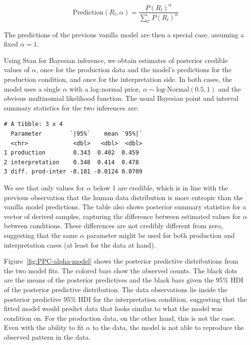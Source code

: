 \documentclass{article}
\begin{document}
\[\text{Prediction}(R_{l}, \alpha) = \frac{P(R_{l})^\alpha}{\sum_{l'} P(R_{l})^\alpha}\]

The predictions of the previous vanilla model are then a special case, assuming a fixed \(\alpha =1\).

Using Stan \citep{Team2023:The-Stan-Core-L} for Bayesian inference, we obtain estimates of posterior credible values of \(\alpha\), once for the production data and the model's predictions for the production condition, and once for the interpretation side.
In both cases, the model uses a single \(\alpha\) with a log-normal prior, \(\alpha \sim \text{log-Normal}(0.5,1)\) and the obvious multinomial likelihood function.
The usual Bayesian point and interval summary statistics for the two inferences are: 

\begin{verbatim}
# A tibble: 3 x 4
  Parameter        `|95%`    mean `95%|`
  <chr>             <dbl>   <dbl>  <dbl>
1 production        0.343  0.402  0.459
2 interpretation    0.348  0.414  0.478
3 diff. prod-inter -0.101 -0.0124 0.0709
\end{verbatim}

We see that only values for \(\alpha\) below 1 are credible, which is in line with the previous observation that the human data distribution is more entropic than the vanilla model predictions.
The table also shows posterior summary statistics for a vector of derived samples, capturing the difference between estimated values for $\alpha$ between conditions.
These differences are not credibly different from zero, suggesting that the same \(\alpha\) parameter might be used for both production and interpretation cases (at least for the data at hand).

Figure~\ref{fig:PPC-alpha-model} shows the posterior predictive distributions from the two model fits.
The colored bars show the observed counts.
The black dots are the means of the posterior predictives and the black bars given the 95\% HDI of the posterior predictive distribution.
The data observations lie inside the posterior predictive 95\% HDI for the interpretation condition, suggesting that the fitted model would predict data that looks similar to what the model was condition on.
For the production data, on the other hand, this is not the case.
Even with the ability to fit \(\alpha\) to the data, the model is not able to reproduce the observed pattern in the data.
\end{document}
